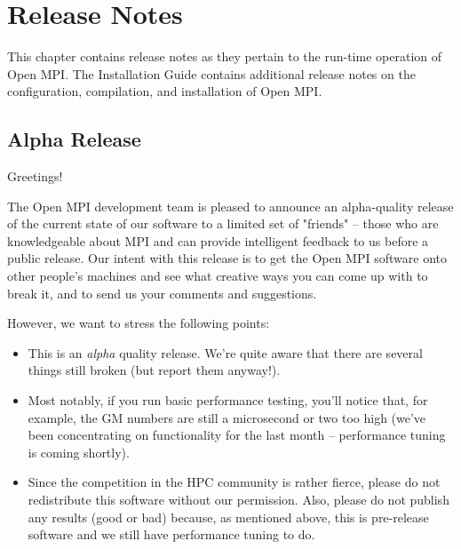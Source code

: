 %
% 
% 
%

\chapter{Release Notes}
\label{sec:release-notes}

This chapter contains release notes as they pertain to the run-time
operation of Open MPI.  The Installation Guide contains additional
release notes on the configuration, compilation, and installation of
Open MPI.


\section{Alpha Release}

Greetings!

The Open MPI development team is pleased to announce an alpha-quality
release of the current state of our software to a limited set of
"friends" -- those who are knowledgeable about MPI and can provide
intelligent feedback to us before a public release.  Our intent with
this release is to get the Open MPI software onto other people's
machines and see what creative ways you can come up with to break it,
and to send us your comments and suggestions.

However, we want to stress the following points:

\begin{itemize}
\item This is an {\em alpha} quality release.  We're quite aware that
  there are several things still broken (but report them anyway!).
  
\item Most notably, if you run basic performance testing, you'll
  notice that, for example, the GM numbers are still a microsecond or
  two too high (we've been concentrating on functionality for the last
  month -- performance tuning is coming shortly).
  
\item Since the competition in the HPC community is rather fierce,
  please do not redistribute this software without our permission.
  Also, please do not publish any results (good or bad) because, as
  mentioned above, this is pre-release software and we still have
  performance tuning to do.
\end{itemize}

